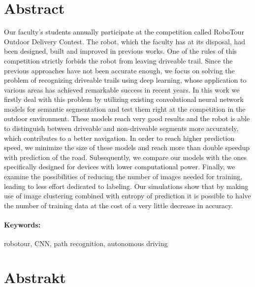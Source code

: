 \documentclass[12pt, oneside]{book}  %
\begin{document}

\newpage 
\section*{Abstract}

Our faculty's students annually participate at the competition called RoboTour
Outdoor Delivery Contest. The robot, which the faculty has at its disposal, had
been designed, built and improved in previous works.
One of the rules of this competition strictly forbids the robot from leaving driveable trail.
Since the previous approaches have not
been accurate enough, we focus on solving the problem of recognizing driveable trails
using deep learning, whose application to various areas has achieved remarkable success
in recent years.
In this work we firstly deal with this problem by utilizing existing convolutional
neural network models for semantic segmentation and test them right at the competition
in the outdoor environment. These models reach very good results and the robot is
able to distinguish between driveable and non-driveable segments more accurately,
which contributes to a better navigation.
In order to reach higher prediction speed, we minimize the size of these models
and reach more than double speedup with prediction of the road. Subsequently, we
compare our models with the ones specifically designed for devices with lower
computational power.
Finally, we examine the possibilities of reducing the number of images needed for
training, leading to less effort dedicated to labeling. Our simulations
show that by making use of image clustering combined with entropy of prediction
it is possible to halve the number of training data at the cost of a very little
decrease in accuracy.

\paragraph*{Keywords:} robotour, CNN, path recognition, autonomous driving


\newpage 
\section*{Abstrakt}
\end{document}
